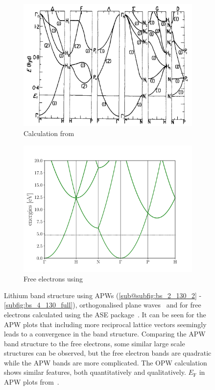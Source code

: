 \documentclass[a4paper,DIV=12,english]{scrartcl}
\begin{document}
\begin{figure}
\begin{subfigure}{0.49\textwidth}
        \includegraphics[width=\textwidth]{./fig/bs.png}
        \caption{Calculation from~\cite{perdew_li}}
        \label{subfig:bs_perdew}
    \end{subfigure}
    \begin{subfigure}{0.49\textwidth}
        \centering 
        \includegraphics[width=\textwidth]{../src/py/li.pdf}
        \caption{Free electrons using~\cite{ase-paper}}
        \label{subfig:bs_free}
    \end{subfigure}
    \caption{Lithium band structure using APWs (\ref{sub@subfig:bs_2_130_2} - \ref{subfig:bs_4_130_full}), orthogonalised plane waves~\cite{perdew_li} and for free electrons calculated using the ASE package~\cite{ase-paper}. It can be seen for the APW plots that including more reciprocal lattice vectors seemingly leads to a convergence in the band structure. Comparing the APW band structure to the free electrons, some similar large scale structures can be observed, but the free electron bands are quadratic while the APW bands are more complicated. The OPW calculation shows similar features, both quantitatively and qualitatively. $E_\text{F}$ in APW plots from~\cite{perdew_li}.}
    \label{fig:bs}
\end{figure}
\end{document}
